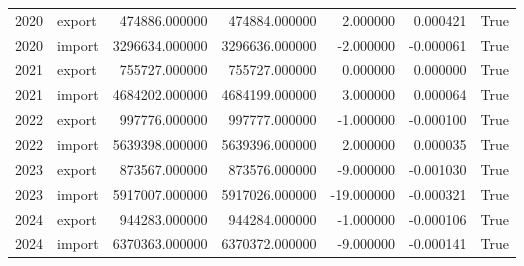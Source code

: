 \begin{tabular}{rlrrrrr}
2020 & export & 474886.000000 & 474884.000000 & 2.000000 & 0.000421 & True \\
2020 & import & 3296634.000000 & 3296636.000000 & -2.000000 & -0.000061 & True \\
2021 & export & 755727.000000 & 755727.000000 & 0.000000 & 0.000000 & True \\
2021 & import & 4684202.000000 & 4684199.000000 & 3.000000 & 0.000064 & True \\
2022 & export & 997776.000000 & 997777.000000 & -1.000000 & -0.000100 & True \\
2022 & import & 5639398.000000 & 5639396.000000 & 2.000000 & 0.000035 & True \\
2023 & export & 873567.000000 & 873576.000000 & -9.000000 & -0.001030 & True \\
2023 & import & 5917007.000000 & 5917026.000000 & -19.000000 & -0.000321 & True \\
2024 & export & 944283.000000 & 944284.000000 & -1.000000 & -0.000106 & True \\
2024 & import & 6370363.000000 & 6370372.000000 & -9.000000 & -0.000141 & True \\
\bottomrule
\end{tabular}
